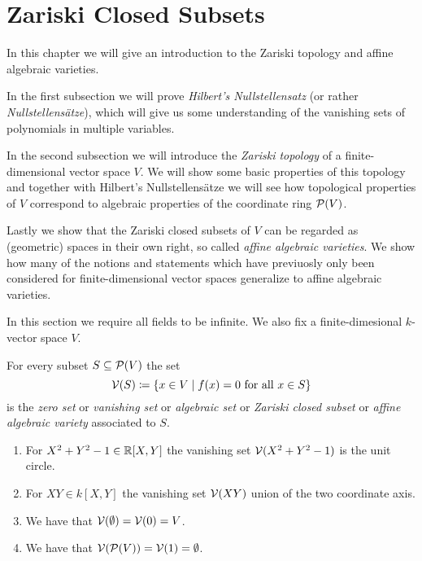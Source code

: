 \chapter{Zariski Closed Subsets}




\begin{fluff}
  In this chapter we will give an introduction to the Zariski topology and affine algebraic varieties.
  
  In the first subsection we will prove \emph{Hilbert’s Nullstellensatz} (or rather \emph{Nullstellensätze}), which will give us some understanding of the vanishing sets of polynomials in multiple variables.
  
  In the second subsection we will introduce the \emph{Zariski topology} of a finite-dimensional vector space $V$.
  We will show some basic properties of this topology and together with Hilbert’s Nullstellensätze we will see how topological properties of $V$ correspond to algebraic properties of the coordinate ring $\mathcal{P}(V)$.
  
  Lastly we show that the Zariski closed subsets of $V$ can be regarded as (geometric) spaces in their own right, so called \emph{affine algebraic varieties}.
  We show how many of the notions and statements which have previuosly only been considered for finite-dimensional vector spaces generalize to affine algebraic varieties.
\end{fluff}


\begin{conventions}
  In this section we require all fields to be infinite.
  We also fix a finite-dimesional $k$-vector space $V$.
\end{conventions}


\begin{definition}
  For every subset $S \subseteq \mathcal{P}(V)$ the set
  \[
              \mathcal{V}(S)
    \coloneqq \{
                x \in V
              \mid
                \text{$f(x) = 0$ for all $x \in S$}
              \}
  \]
  is the \emph{zero set} or \emph{vanishing set} or \emph{algebraic set} or \emph{Zariski closed subset} or \emph{affine algebraic variety} associated to $S$.
\end{definition}


\begin{example}
  \label{example: examples of algebraic subsets}
  \leavevmode
  \begin{enumerate}
    \item
      For $X^2 + Y^2 - 1 \in \mathbb{R}[X,Y]$ the vanishing set $\mathcal{V}(X^2 + Y^2 - 1)$ is the unit circle.
    \item
      For $XY \in k[X,Y]$ the vanishing set $\mathcal{V}(XY)$ union of the two coordinate axis.
    \item
      We have that $\mathcal{V}(\emptyset) = \mathcal{V}(0) = V$.
    \item
      We have that $\mathcal{V}(\mathcal{P}(V)) = \mathcal{V}(1) = \emptyset$.
  \end{enumerate}
\end{example}

